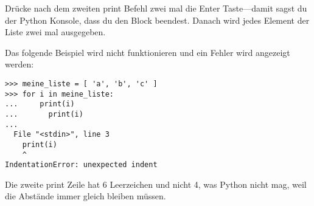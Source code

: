 Drücke nach dem zweiten print Befehl zwei mal die Enter Taste---damit sagst du der Python Konsole, dass du den Block beendest. Danach wird jedes Element der Liste zwei mal ausgegeben.
\par
\noindent
Das folgende Beispiel wird nicht funktionieren und ein Fehler wird angezeigt werden:

\begin{Verbatim}[frame=single]
>>> meine_liste = [ 'a', 'b', 'c' ]
>>> for i in meine_liste:
...     print(i)
...       print(i)
...
  File "<stdin>", line 3
    print(i)
    ^
IndentationError: unexpected indent
\end{Verbatim}

Die zweite print Zeile hat 6 Leerzeichen und nicht 4, was Python nicht mag, weil die Abstände immer gleich bleiben müssen.


